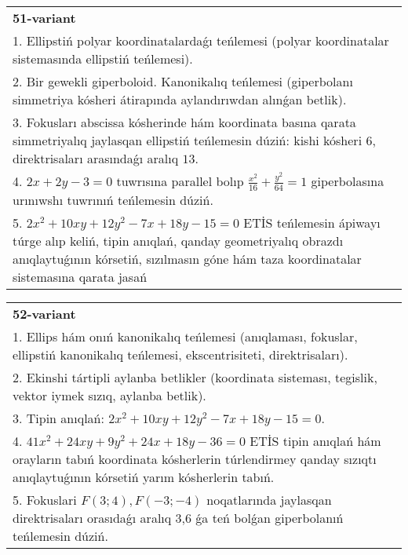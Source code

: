 \documentclass{article}
\begin{document}
\begin{tabular}{m{17cm}}
\textbf{51-variant}\\
1. Ellipstiń polyar koordinatalardaǵı teńlemesi (polyar koordinatalar sistemasında ellipstiń teńlemesi).\\

2. Bir gewekli giperboloid. Kanonikalıq teńlemesi (giperbolanı simmetriya kósheri átirapında aylandırıwdan alınǵan betlik).\\

3. Fokusları abscissa kósherinde hám koordinata basına qarata simmetriyalıq jaylasqan ellipstiń teńlemesin dúziń: kishi kósheri $6$, direktrisaları arasındaǵı aralıq $13$.\\

4. $2x + 2y - 3 = 0$ tuwrısına parallel bolıp $\frac{x^{2}}{16} + \frac{y^{2}}{64} = 1$ giperbolasına urınıwshı tuwrınıń teńlemesin dúziń.  \\

5. $2x^{2} + 10xy + 12y^{2} - 7x + 18y - 15 = 0$ ETİS teńlemesin ápiwayı túrge alıp keliń, tipin anıqlań, qanday geometriyalıq obrazdı anıqlaytuǵının kórsetiń, sızılmasın góne hám taza koordinatalar sistemasına qarata jasań  
\end{tabular}
\vspace{1cm}


\begin{tabular}{m{17cm}}
\textbf{52-variant}\\
1. Ellips hám onıń kanonikalıq teńlemesi (anıqlaması, fokuslar, ellipstiń kanonikalıq teńlemesi, ekscentrisiteti, direktrisaları).\\

2. Ekinshi tártipli aylanba betlikler (koordinata sisteması, tegislik, vektor iymek sızıq, aylanba betlik).\\

3. Tipin anıqlań: $2 x^{2}+10 xy+12 y^{2}-7 x+18 y-15=0$.\\

4. $41x^{2} + 24xy + 9y^{2} + 24x + 18y - 36 = 0$ ETİS tipin anıqlań hám orayların tabıń koordinata kósherlerin túrlendirmey qanday sızıqtı anıqlaytuǵının kórsetiń yarım kósherlerin tabıń.  \\

5. Fokuslari $F(3;4), F(-3;-4)$ noqatlarında jaylasqan direktrisaları orasıdaǵı aralıq 3,6 ǵa teń bolǵan giperbolanıń teńlemesin dúziń.  
\end{tabular}
\vspace{1cm}
\end{document}

